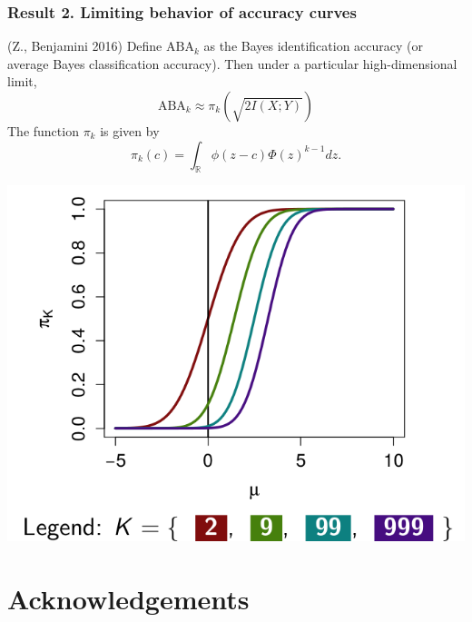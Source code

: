 \documentclass{beamer}
\begin{document}
\begin{frame}
\frametitle{Result 2. Limiting behavior of accuracy curves} 
(Z., Benjamini 2016)  Define
$\text{ABA}_k$ as the Bayes identification accuracy (or average Bayes
classification accuracy).  Then under a particular high-dimensional
limit,
\begin{equation}\label{abepi}
\text{ABA}_k \approx \pi_k(\sqrt{2 I(X; Y)})
\end{equation}
The function $\pi_k$ is given by
\[
\pi_k(c) = \int_{\mathbb{R}} \phi(z - c)  \Phi(z)^{k-1} dz.
\]
\begin{center}
\includegraphics[scale = 0.2]{piK.png}
\end{center}
\end{frame}

\section*{Acknowledgements}

\begin{frame}
\sectionpage
\end{frame}
\end{document}
